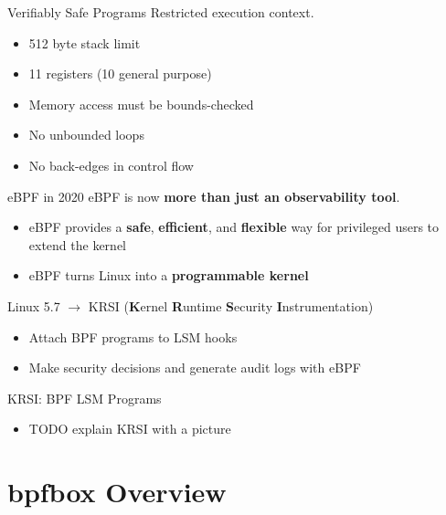 \documentclass[12pt, dvipsnames, aspectratio=169]{beamer}
\begin{document}
\begin{frame}[c]{Verifiably Safe Programs}
Restricted execution context.
\begin{itemize}
    \item 512 byte stack limit
    \item 11 registers (10 general purpose)
    \item Memory access must be bounds-checked
    \item No unbounded loops
    \item No back-edges in control flow
\end{itemize}
\end{frame}

\begin{frame}[c]{eBPF in 2020}
eBPF is now \textbf{more than just an observability tool}.
\begin{itemize}
    \item eBPF provides a \textbf{safe}, \textbf{efficient}, and \textbf{flexible} way for privileged users to extend the kernel
    \item eBPF turns Linux into a \textbf{programmable kernel}
\end{itemize}
\vfill
Linux 5.7 $\rightarrow$ KRSI (\textbf{K}ernel \textbf{R}untime \textbf{S}ecurity \textbf{I}nstrumentation)
\begin{itemize}
    \item Attach BPF programs to LSM hooks
    \item Make security decisions and generate audit logs with eBPF
\end{itemize}
\end{frame}

\begin{frame}[c]{KRSI: BPF LSM Programs}
\begin{itemize}
    \item TODO explain KRSI with a picture
\end{itemize}
\end{frame}

\section{bpfbox Overview}
\end{document}
